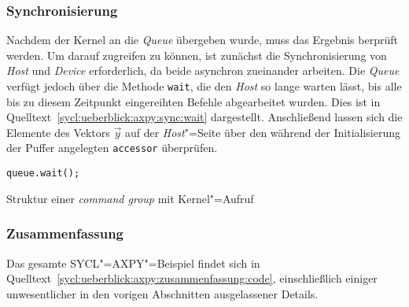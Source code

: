\subsubsection{Synchronisierung}
\label{sycl:ueberblick:axpy:sync}

Nachdem der Kernel an die \textit{Queue} übergeben wurde, muss das Ergebnis
berprüft werden. Um darauf zugreifen zu können, ist zunächst die
Synchronisierung von \textit{Host} und \textit{Device} erforderlich, da beide
asynchron zueinander arbeiten. Die \textit{Queue} verfügt jedoch über die
Methode \texttt{wait}, die den \textit{Host} so lange warten lässt, bis alle bis
zu diesem Zeitpunkt eingereihten Befehle abgearbeitet wurden. Dies ist in
Quelltext~\ref{sycl:ueberblick:axpy:sync:wait} dargestellt. Anschließend
lassen sich die Elemente des Vektors $\vec{y}$ auf der \textit{Host}"=Seite
über den während der Initialisierung der Puffer angelegten \texttt{accessor}
überprüfen.

\begin{code}
    \begin{verbatim}
queue.wait();
    \end{verbatim}
    \caption{Struktur einer \textit{command group} mit Kernel"=Aufruf}
    \label{sycl:ueberblick:axpy:sync:wait}
\end{code}

\subsubsection{Zusammenfassung}
\label{sycl:ueberblick:axpy:zusammenfassung}

Das gesamte SYCL"=AXPY"=Beispiel findet sich in
Quelltext~\ref{sycl:ueberblick:axpy:zusammenfassung:code}, einschließlich
einiger unwesentlicher in den vorigen Abschnitten ausgelassener Details.

